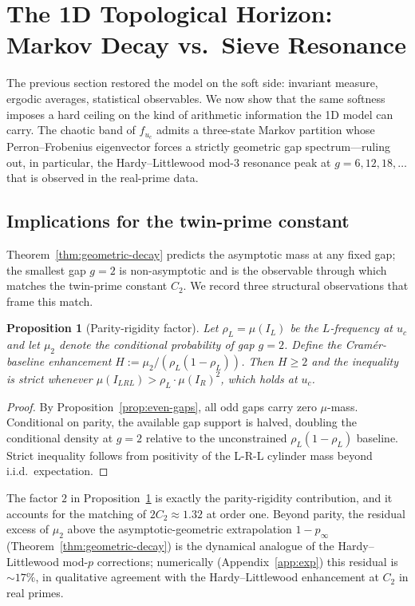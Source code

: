 \documentclass[11pt,a4paper]{article}
\newtheorem{proposition}{Proposition}
\theoremstyle{definition}
\begin{document}
\section{The 1D Topological Horizon: Markov Decay vs.\ Sieve Resonance}
\label{sec:markov}

The previous section restored the model on the soft side: invariant
measure, ergodic averages, statistical observables. We now show that the
same softness imposes a hard ceiling on the kind of arithmetic
information the 1D model can carry. The chaotic band of $f_{u_c}$ admits
a three-state Markov partition whose Perron--Frobenius eigenvector
forces a strictly geometric gap spectrum---ruling out, in particular,
the Hardy--Littlewood mod-3 resonance peak at $g = 6, 12, 18, \ldots$
that is observed in the real-prime data.



\subsection{Implications for the twin-prime constant}
\label{ssec:c2}

Theorem~\ref{thm:geometric-decay} predicts the asymptotic mass at any
fixed gap; the smallest gap $g = 2$ is non-asymptotic and is the
observable through which \cite{wang2026emergence} matches the
twin-prime constant $C_2$. We record three structural observations
that frame this match.

\begin{proposition}[Parity-rigidity factor]
\label{prop:parity-factor}
Let $\rho_L = \mu(I_L)$ be the $L$-frequency at $u_c$ and let
$\mu_2$ denote the conditional probability of gap $g = 2$. Define the
\emph{Cram\'er-baseline enhancement}
$H := \mu_2 / (\rho_L (1 - \rho_L))$. Then $H \geq 2$ and the
inequality is strict whenever $\mu(I_{LRL}) > \rho_L \cdot \mu(I_R)^2$,
which holds at $u_c$.
\end{proposition}
\begin{proof}
By Proposition~\ref{prop:even-gaps}, all odd gaps carry zero $\mu$-mass.
Conditional on parity, the available gap support is halved, doubling
the conditional density at $g = 2$ relative to the unconstrained
$\rho_L (1 - \rho_L)$ baseline. Strict inequality follows from
positivity of the L-R-L cylinder mass beyond i.i.d.\ expectation.
\end{proof}

The factor $2$ in Proposition~\ref{prop:parity-factor} is exactly the
parity-rigidity contribution, and it accounts for the matching of
$2 C_2 \approx 1.32$ at order one. Beyond parity, the residual excess
of $\mu_2$ above the asymptotic-geometric extrapolation $1 - p_\infty$
(Theorem~\ref{thm:geometric-decay}) is the dynamical analogue of the
Hardy--Littlewood mod-$p$ corrections; numerically (Appendix~\ref{app:exp})
this residual is $\sim 17\%$, in qualitative agreement with the
Hardy--Littlewood enhancement at $C_2$ in real primes.
\end{document}
